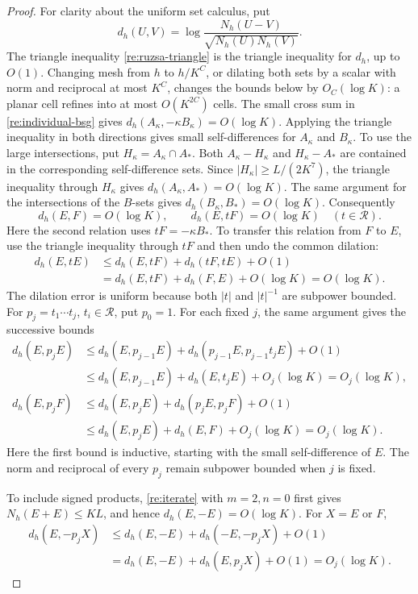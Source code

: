 \begin{proof}
For clarity about the uniform set calculus, put
\[
 d_h(U,V)=\log\frac{N_h(U-V)}{\sqrt{N_h(U)N_h(V)}}.
\]
The triangle inequality \eqref{re:ruzsa-triangle} is the triangle
inequality for \(d_h\), up to \(O(1)\).  Changing mesh from \(h\)
to \(h/K^C\), or dilating both sets by a scalar with norm and
reciprocal at most \(K^C\), changes the bounds below by \(O_C(\log K)\):
a planar cell refines into at most \(O(K^{2C})\) cells.
The small cross sum in \eqref{re:individual-bsg} gives
\(d_h(A_\kappa,-\kappa B_\kappa)=O(\log K)\).  Applying the triangle
inequality in both directions gives small self-differences for
\(A_\kappa\) and \(B_\kappa\).  To use the large intersections,
put \(H_\kappa=A_\kappa\cap A_*\).  Both
\(A_\kappa-H_\kappa\) and \(H_\kappa-A_*\) are contained
in the corresponding self-difference sets.  Since
\(|H_\kappa|\ge L/(2K^7)\), the triangle inequality through
\(H_\kappa\) gives \(d_h(A_\kappa,A_*)=O(\log K)\).
The same argument for the intersections of the \(B\)-sets gives
\(d_h(B_\kappa,B_*)=O(\log K)\).  Consequently
\begin{equation}\label{re:fixed-cross}
 d_h(E,F)=O(\log K),\qquad
 d_h(E,tF)=O(\log K)\quad(t\in\mathcal R).
\end{equation}
Here the second relation uses \(tF=-\kappa B_*\).
To transfer this relation from \(F\) to \(E\), use the triangle
inequality through \(tF\) and then undo the common dilation:
\begin{align*}
 d_h(E,tE)
 &\le d_h(E,tF)+d_h(tF,tE)+O(1)\\
 &=d_h(E,tF)+d_h(F,E)+O(\log K)
 =O(\log K).
\end{align*}
The dilation error is uniform because both \(|t|\) and
\(|t|^{-1}\) are subpower bounded.  For
\(p_j=t_1\cdots t_j\), \(t_i\in\mathcal R\), put \(p_0=1\).
For each fixed \(j\), the same argument gives the successive bounds
\begin{align*}
 d_h(E,p_jE)
 &\le d_h(E,p_{j-1}E)
       +d_h(p_{j-1}E,p_{j-1}t_jE)+O(1)\\
 &\le d_h(E,p_{j-1}E)+d_h(E,t_jE)+O_j(\log K)
 =O_j(\log K),\\
 d_h(E,p_jF)
 &\le d_h(E,p_jE)+d_h(p_jE,p_jF)+O(1)\\
 &\le d_h(E,p_jE)+d_h(E,F)+O_j(\log K)
 =O_j(\log K).
\end{align*}
Here the first bound is inductive, starting with the small
self-difference of \(E\).  The norm and reciprocal of every
\(p_j\) remain subpower bounded when \(j\) is fixed.

To include signed products, \eqref{re:iterate} with \(m=2,n=0\)
first gives \(N_h(E+E)\le KL\), and hence
\(d_h(E,-E)=O(\log K)\).  For \(X=E\) or \(F\),
\begin{align*}
 d_h(E,-p_jX)
 &\le d_h(E,-E)+d_h(-E,-p_jX)+O(1)\\
 &=d_h(E,-E)+d_h(E,p_jX)+O(1)
 =O_j(\log K).
\end{align*}


\end{proof}
